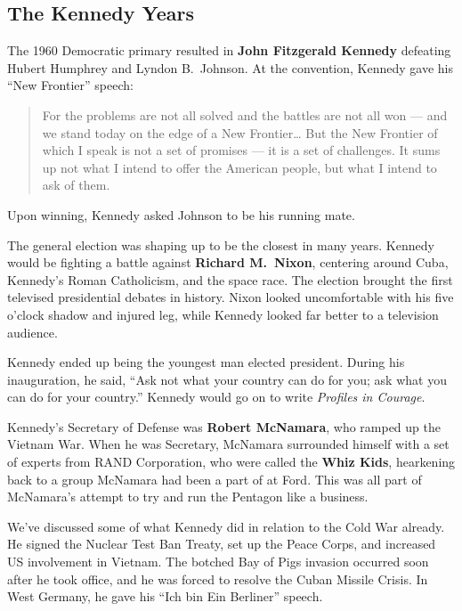\subsection*{The Kennedy Years}

The 1960 Democratic primary resulted in \textbf{John Fitzgerald Kennedy}
defeating Hubert Humphrey and Lyndon B.\ Johnson.
At the convention, Kennedy gave his ``New Frontier'' speech:
\begin{quote}
  For the problems are not all solved and the battles are not all won ---
  and we stand today on the edge of a New Frontier\ldots{}
  But the New Frontier of which I speak is not a set of promises --- it is a set of challenges.
  It sums up not what I intend to offer the American people, but what I intend to ask of them.
\end{quote}
Upon winning, Kennedy asked Johnson to be his running mate.

The general election was shaping up to be the closest in many years.
Kennedy would be fighting a battle against \textbf{Richard M.\ Nixon},
centering around Cuba, Kennedy's Roman Catholicism, and the space race.
The election brought the first televised presidential debates in history.
Nixon looked uncomfortable with his five o'clock shadow and injured leg,
while Kennedy looked far better to a television audience.

Kennedy ended up being the youngest man elected president.
During his inauguration, he said, ``Ask not what your country can do for you; ask what you can do for your country.''
Kennedy would go on to write \textit{Profiles in Courage}.

Kennedy's Secretary of Defense was \textbf{Robert McNamara}, who ramped up the Vietnam War.
When he was Secretary, McNamara surrounded himself with a set of experts from RAND Corporation,
who were called the \textbf{Whiz Kids}, hearkening back to a group McNamara had been a part of at Ford.
This was all part of McNamara's attempt to try and run the Pentagon like a business.

We've discussed some of what Kennedy did in relation to the Cold War already.
He signed the Nuclear Test Ban Treaty, set up the Peace Corps, and increased US involvement in Vietnam.
The botched Bay of Pigs invasion occurred soon after he took office,
and he was forced to resolve the Cuban Missile Crisis.
In West Germany, he gave his ``Ich bin Ein Berliner'' speech.

